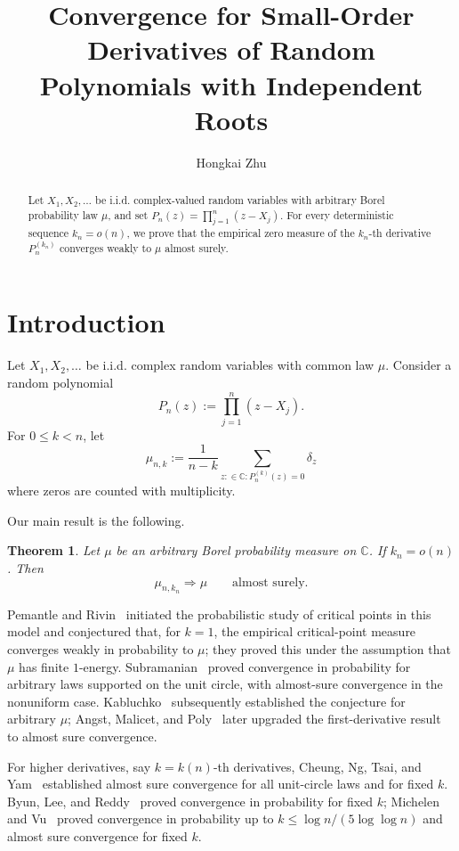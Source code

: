 \documentclass[10pt,reqno]{amsart}
\title{Convergence for Small-Order Derivatives of Random Polynomials with Independent Roots}
\author{Hongkai Zhu}
\newtheorem{theorem}{Theorem}[section]
\theoremstyle{remark}
\newcommand{\C}{\mathbb C}
\newcommand{\weak}{\Rightarrow}
\begin{document}
\begin{abstract}
Let $X_1,X_2,\ldots$ be i.i.d. complex-valued random variables with arbitrary Borel probability law $\mu$, and set $P_n(z)=\prod_{j=1}^n(z-X_j)$. For every deterministic sequence $k_n=o(n)$, we prove that the empirical zero measure of the $k_n$-th derivative $P_n^{(k_n)}$ converges weakly to $\mu$ almost surely.
\end{abstract}
\maketitle

\section{Introduction}
Let $X_1,X_2,\ldots$ be i.i.d. complex random variables with common law $\mu$. Consider a random polynomial
\[P_n(z):=\prod_{j=1}^n (z-X_j).\] 
For $0\le k<n$, let
\[\mu_{n,k}:=\frac{1}{n-k}\sum_{z:\in\C: P^{(k)}_n(z)=0}\delta_z\] where zeros are counted with multiplicity.

Our main result is the following.
\begin{theorem}\label{thm:main}
    Let $\mu$ be an arbitrary Borel probability measure on $\C$. If $k_n=o(n)$. Then 
    \[\mu_{n,k_n}\weak \mu\qquad\text{almost surely}.\]
\end{theorem}

Pemantle and Rivin~\cite{PR13} initiated the probabilistic study of critical points in this model and conjectured that, for $k=1$, the empirical critical-point measure converges weakly in probability to $\mu$; they proved this under the assumption that $\mu$ has finite $1$-energy. Subramanian~\cite{Sub12} proved convergence in probability for arbitrary laws supported on the unit circle, with almost-sure convergence in the nonuniform case. Kabluchko~\cite{Kab15} subsequently established the conjecture for arbitrary $\mu$; Angst, Malicet, and Poly~\cite{AMP24} later upgraded the first-derivative result to almost sure convergence. 

For higher derivatives, say $k=k(n)$-th derivatives, Cheung, Ng, Tsai, and Yam~\cite{CNTY15} established almost sure convergence for all unit-circle laws and for fixed $k$. Byun, Lee, and Reddy~\cite{BLR22} proved convergence in probability for fixed $k$; Michelen and Vu~\cite{MV24a,MV24b} proved convergence in probability up to $k\le \log n/(5\log\log n)$ and almost sure convergence for fixed $k$. 
\end{document}
